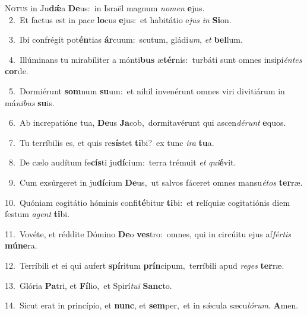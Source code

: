 \lettrine{\initial\textcolor{\initialcolor}{N}}{otus} in Ju\-\textbf{dǽ}\-a \textbf{De}\-us:~\star in Israël magnum \textit{no}\-\textit{men} \textbf{e}\-jus.\\
{\numbfont\textcolor{\numbcolor}{~2.}}~Et factus est in pace \textbf{lo}\-cus \textbf{e}\-jus:~\star et habitátio e\textit{jus} \textit{in} \textbf{Si}\-on.\par
{\numbfont\textcolor{\numbcolor}{~3.}}~Ibi confrégit pot\-\textbf{én}\-tias \textbf{ár}\-cuum:~\star scutum, gládi\-\textit{um}\-, \textit{et} \textbf{bel}\-lum.\par
{\numbfont\textcolor{\numbcolor}{~4.}}~Illúminans tu mirabíliter a mónti\textbf{bus} æ\-\textbf{tér}\-nis:~\star turbáti sunt omnes insipi\-\textit{én}\-\textit{tes} \textbf{cor}\-de.\par
{\numbfont\textcolor{\numbcolor}{~5.}}~Dormiérunt \textbf{som}\-num \textbf{su}\-um:~\star et nihil invenérunt omnes viri divitiárum in má\-\textit{ni}\-\textit{bus} \textbf{su}\-is.\par
{\numbfont\textcolor{\numbcolor}{~6.}}~Ab increpatióne tua, \textbf{De}\-us \textbf{Ja}\-cob,~\star dormitavérunt qui ascen\-\textit{dé}\-\textit{runt} \textbf{e}\-quos.\par
{\numbfont\textcolor{\numbcolor}{~7.}}~Tu terríbilis es, et quis re\-\textbf{sís}\-tet \textbf{ti}\-bi?~\star ex tunc \textit{i}\-\textit{ra} \textbf{tu}\-a.\par
{\numbfont\textcolor{\numbcolor}{~8.}}~De cælo audítum fe\-\textbf{cís}\-ti ju\-\textbf{dí}\-cium:~\star terra trémuit \textit{et} \textit{qui}\-\textbf{é}vit.\par
{\numbfont\textcolor{\numbcolor}{~9.}}~Cum exsúrgeret in ju\-\textbf{dí}\-cium \textbf{De}\-us,~\star ut salvos fáceret omnes mansu\-\textit{é}\-\textit{tos} \textbf{ter}\-ræ.\par
{\numbfont\textcolor{\numbcolor}{10.}}~Quóniam cogitátio hóminis confi\-\textbf{té}\-bitur \textbf{ti}\-bi:~\star et relíquiæ cogitatiónis diem festum \textit{a}\-\textit{gent} \textbf{ti}\-bi.\par
{\numbfont\textcolor{\numbcolor}{11.}}~Vovéte, et réddite Dómino \textbf{De}\-o \textbf{ves}\-tro:~\star omnes, qui in circúitu ejus af\-\textit{fér}\-\textit{tis} \textbf{mú}\-\textbf{ne}ra.\par
{\numbfont\textcolor{\numbcolor}{12.}}~Terríbili et ei qui aufert \textbf{spí}\-ritum \textbf{prín}\-cipum,~\star terríbili apud \textit{re}\-\textit{ges} \textbf{ter}\-ræ.\par
{\numbfont\textcolor{\numbcolor}{13.}}~Glória \textbf{Pa}\-tri, et \textbf{Fí}\-lio,~\star et Spirí\-\textit{tu}\-\textit{i} \textbf{Sanc}\-to.\par
{\numbfont\textcolor{\numbcolor}{14.}}~Sicut erat in princípio, et \textbf{nunc}\-, et \textbf{sem}\-per,~\star et in sǽcula sæcu\-\textit{ló}\-\textit{rum}. \textbf{A}\-men.\par

